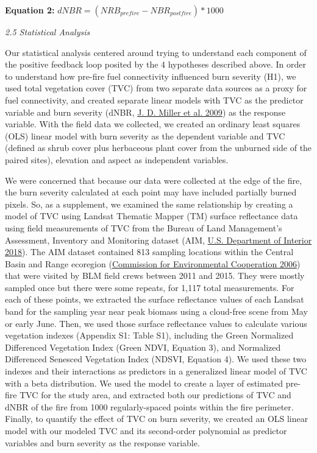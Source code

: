 \documentclass[
  12pt,
]{article}
\begin{document}
\textbf{Equation 2:} \(dNBR = (NRB_{prefire} - NBR_{postfire})*1000\)

\emph{2.5 Statistical Analysis}

Our statistical analysis centered around trying to understand each
component of the positive feedback loop posited by the 4 hypotheses
described above. In order to understand how pre-fire fuel connectivity
influenced burn severity (H1), we used total vegetation cover (TVC) from
two separate data sources as a proxy for fuel connectivity, and created
separate linear models with TVC as the predictor variable and burn
severity (dNBR, \protect\hyperlink{ref-Miller2009}{J. D. Miller et al.
2009}) as the response variable. With the field data we collected, we
created an ordinary least squares (OLS) linear model with burn severity
as the dependent variable and TVC (defined as shrub cover plus
herbaceous plant cover from the unburned side of the paired sites),
elevation and aspect as independent variables.

We were concerned that because our data were collected at the edge of
the fire, the burn severity calculated at each point may have included
partially burned pixels. So, as a supplement, we examined the same
relationship by creating a model of TVC using Landsat Thematic Mapper
(TM) surface reflectance data using field measurements of TVC from the
Bureau of Land Management's Assessment, Inventory and Monitoring dataset
(AIM, \protect\hyperlink{ref-AIM}{U.S. Department of Interior 2018}).
The AIM dataset contained 813 sampling locations within the Central
Basin and Range ecoregion (\protect\hyperlink{ref-CEC2006}{Commission
for Environmental Cooperation 2006}) that were visited by BLM field
crews between 2011 and 2015. They were mostly sampled once but there
were some repeats, for 1,117 total measurements. For each of these
points, we extracted the surface reflectance values of each Landsat band
for the sampling year near peak biomass using a cloud-free scene from
May or early June. Then, we used those surface reflectance values to
calculate various vegetation indexes (Appendix S1: Table S1), including
the Green Normalized Differenced Vegetation Index (Green NDVI, Equation
3), and Normalized Differenced Senesced Vegetation Index (NDSVI,
Equation 4). We used these two indexes and their interactions as
predictors in a generalized linear model of TVC with a beta
distribution. We used the model to create a layer of estimated pre-fire
TVC for the study area, and extracted both our predictions of TVC and
dNBR of the fire from 1000 regularly-spaced points within the fire
perimeter. Finally, to quantify the effect of TVC on burn severity, we
created an OLS linear model with our modeled TVC and its second-order
polynomial as predictor variables and burn severity as the response
variable.
\end{document}
